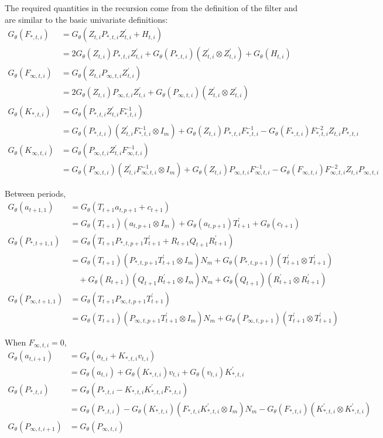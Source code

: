 \documentclass[12pt]{article}
\newcommand{\Gt}{G_\theta}
\begin{document}
	The required quantities in the recursion come from the definition of the filter and are similar to the basic univariate definitions: 
	\begin{align*}
	\Gt(F_{*,t,i}) &= \Gt(Z_{t,i} P_{*,t,i} Z_{t,i}^\prime + H_{t,i}) \\
	&= 2 \Gt(Z_{t,i})P_{*,t,i} Z_{t,i}^\prime + \Gt(P_{*,t,i}) (Z_{t,i}^\prime \otimes Z_{t,i}^\prime) + \Gt(H_{t,i}) \\
	\Gt(F_{\infty,t,i}) &= \Gt(Z_{t,i} P_{\infty,t,i} Z_{t,i}^\prime) \\
	&= 2 \Gt(Z_{t,i})P_{\infty,t,i} Z_{t,i}^\prime + \Gt(P_{\infty,t,i}) (Z_{t,i}^\prime \otimes Z_{t,i}^\prime)  \\
	\Gt(K_{*,t,i}) &= \Gt(P_{*,t,i} Z_{t,i}^\prime F_{*,t,i}^{-1}) \\
	&= \Gt(P_{*,t,i}) (Z_{t,i}^\prime F_{*,t,i}^{-1} \otimes I_m) + \Gt(Z_{t,i}) P_{*,t,i} F_{*,t,i}^{-1} - \Gt(F_{*,t,i}) F_{*,t,i}^{-2} Z_{t,i} P_{*,t,i}\\
	\Gt(K_{\infty,t,i}) &= \Gt(P_{\infty,t,i} Z_{t,i}^\prime F_{\infty,t,i}^{-1}) \\
	&= \Gt(P_{\infty,t,i}) (Z_{t,i}^\prime F_{\infty,t,i}^{-1} \otimes I_m) + \Gt(Z_{t,i}) P_{\infty,t,i} F_{\infty,t,i}^{-1} - \Gt(F_{\infty,t,i}) F_{\infty,t,i}^{-2} Z_{t,i} P_{\infty,t,i}
	\end{align*}

	Between periods, 
	\begin{align*}
	\Gt(a_{t+1,1}) &= \Gt(T_{t+1} a_{t,p+1} + c_{t+1}) \\
	&= \Gt(T_{t+1}) (a_{t,p+1} \otimes I_m) + \Gt(a_{t,p+1}) T_{t+1}^\prime + \Gt(c_{t+1})\\ 
	\Gt(P_{*,t+1,1}) &= \Gt(T_{t+1} P_{*,t,p+1} T_{t+1}^\prime + R_{t+1} Q_{t+1} R_{t+1}^\prime) \\
	&= \Gt(T_{t+1})(P_{*,t,p+1} T_{t+1}^\prime \otimes I_m) N_m + \Gt(P_{*,t,p+1})(T_{t+1}^\prime \otimes T_{t+1}^\prime) \\
	&\quad + \Gt(R_{t+1})(Q_{t+1} R_{t+1}^\prime \otimes I_m) N_m + \Gt(Q_{t+1})(R_{t+1}^\prime \otimes R_{t+1}^\prime) \\
	\Gt(P_{\infty,t+1,1}) &= \Gt(T_{t+1} P_{\infty,t,p+1} T_{t+1}^\prime) \\
	&= \Gt(T_{t+1})(P_{\infty,t,p+1} T_{t+1}^\prime \otimes I_m) N_m + \Gt(P_{\infty,t,p+1})(T_{t+1}^\prime \otimes T_{t+1}^\prime)
	\end{align*}

	When $F_{\infty,t,i} = 0$, 
	\begin{align*}
	\Gt(a_{t,i+1}) &= \Gt(a_{t,i} + K_{*,t,i} v_{t,i}) \\
	&= \Gt(a_{t,i}) + \Gt(K_{*,t,i})v_{t,i} + \Gt(v_{t,i}) K_{*,t,i}^{\prime}  \\
	\Gt(P_{*,t,i}) &= \Gt(P_{*,t,i} - K_{*,t,i} K_{*,t,i}^\prime F_{*,t,i}) \\
	&= \Gt(P_{*,t,i}) - \Gt(K_{*,t,i})(F_{*,t,i}K_{*,t,i}^\prime \otimes I_m) N_m - \Gt(F_{*,t,i})(K_{*,t,i}^\prime \otimes K_{*,t,i}^\prime) \\
	\Gt(P_{\infty,t,i+1}) &= \Gt(P_{\infty,t,i}) 
	\end{align*}
\end{document}
